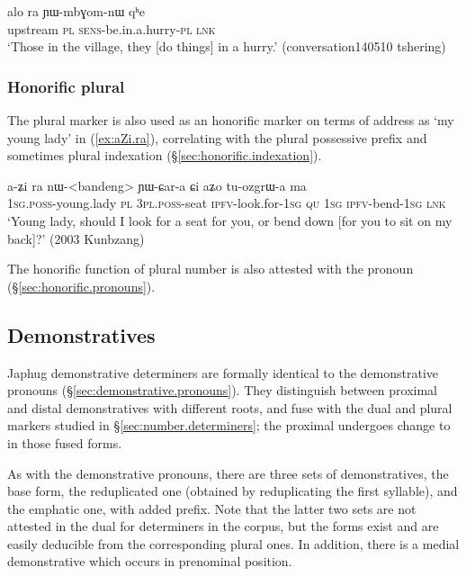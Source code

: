 \begin{exe}
\ex \label{ex:alo.ra}
 \gll alo ra ɲɯ-mbɣom-nɯ qʰe \\
 upstream \textsc{pl} \textsc{sens}-be.in.a.hurry-\textsc{pl} \textsc{lnk} \\
 \glt `Those in the village, they [do things] in a hurry.' (conversation140510 tshering)
\end{exe}

\subsubsection{Honorific plural} \label{sec:ra.honorific}
The plural marker  is also used as an honorific marker on terms of address as  `my young lady' in (\ref{ex:aZi.ra}), correlating with the plural possessive prefix  and sometimes plural indexation (§\ref{sec:honorific.indexation}).

\begin{exe}
\ex \label{ex:aZi.ra}
 \gll a-ʑi ra nɯ-<bandeng> ɲɯ-ɕar-a ɕi aʑo tu-ozgrɯ-a ma \\
\textsc{1sg}.\textsc{poss}-young.lady \textsc{pl} \textsc{3pl}.\textsc{poss}-seat \textsc{ipfv}-look.for-\textsc{1sg} \textsc{qu} \textsc{1sg} \textsc{ipfv}-bend-\textsc{1sg} \textsc{lnk} \\
\glt `Young lady, should I look for a seat for you, or bend down [for you to sit on my back]?' (2003 Kunbzang)
\end{exe}

The honorific function of plural number is also attested with the pronoun  (§\ref{sec:honorific.pronouns}).

\subsection{Demonstratives} \label{sec:demonstrative.determiners}
Japhug demonstrative determiners are formally identical  to the demonstrative pronouns (§\ref{sec:demonstrative.pronouns}). They distinguish between proximal and distal demonstratives with different roots, and fuse with the dual and plural markers studied in §\ref{sec:number.determiners}; the proximal  undergoes change to  in those fused forms.

As with the demonstrative pronouns, there are three sets of demonstratives, the base form, the reduplicated one (obtained by reduplicating the first syllable), and the emphatic one, with added  prefix. Note that the latter two sets are not attested in the dual for determiners in the corpus, but the forms exist and are easily deducible from the corresponding plural ones. In addition, there is a medial demonstrative  which occurs in prenominal position.

